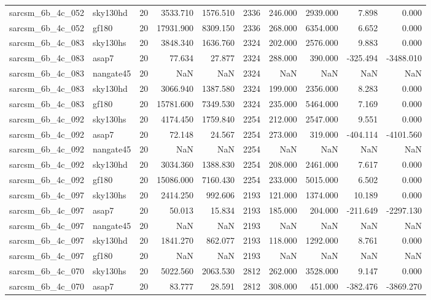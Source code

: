 \begin{longtable}{llrrrrrrrr}
sarcsm\_6b\_4c\_052 & sky130hd & 20 & 3533.710 & 1576.510 & 2336 & 246.000 & 2939.000 & 7.898 & 0.000 \\
sarcsm\_6b\_4c\_052 & gf180 & 20 & 17931.900 & 8309.150 & 2336 & 268.000 & 6354.000 & 6.652 & 0.000 \\
sarcsm\_6b\_4c\_083 & sky130hs & 20 & 3848.340 & 1636.760 & 2324 & 202.000 & 2576.000 & 9.883 & 0.000 \\
sarcsm\_6b\_4c\_083 & asap7 & 20 & 77.634 & 27.877 & 2324 & 288.000 & 390.000 & -325.494 & -3488.010 \\
sarcsm\_6b\_4c\_083 & nangate45 & 20 & NaN & NaN & 2324 & NaN & NaN & NaN & NaN \\
sarcsm\_6b\_4c\_083 & sky130hd & 20 & 3066.940 & 1387.580 & 2324 & 199.000 & 2356.000 & 8.283 & 0.000 \\
sarcsm\_6b\_4c\_083 & gf180 & 20 & 15781.600 & 7349.530 & 2324 & 235.000 & 5464.000 & 7.169 & 0.000 \\
sarcsm\_6b\_4c\_092 & sky130hs & 20 & 4174.450 & 1759.840 & 2254 & 212.000 & 2547.000 & 9.551 & 0.000 \\
sarcsm\_6b\_4c\_092 & asap7 & 20 & 72.148 & 24.567 & 2254 & 273.000 & 319.000 & -404.114 & -4101.560 \\
sarcsm\_6b\_4c\_092 & nangate45 & 20 & NaN & NaN & 2254 & NaN & NaN & NaN & NaN \\
sarcsm\_6b\_4c\_092 & sky130hd & 20 & 3034.360 & 1388.830 & 2254 & 208.000 & 2461.000 & 7.617 & 0.000 \\
sarcsm\_6b\_4c\_092 & gf180 & 20 & 15086.000 & 7160.430 & 2254 & 233.000 & 5015.000 & 6.502 & 0.000 \\
sarcsm\_6b\_4c\_097 & sky130hs & 20 & 2414.250 & 992.606 & 2193 & 121.000 & 1374.000 & 10.189 & 0.000 \\
sarcsm\_6b\_4c\_097 & asap7 & 20 & 50.013 & 15.834 & 2193 & 185.000 & 204.000 & -211.649 & -2297.130 \\
sarcsm\_6b\_4c\_097 & nangate45 & 20 & NaN & NaN & 2193 & NaN & NaN & NaN & NaN \\
sarcsm\_6b\_4c\_097 & sky130hd & 20 & 1841.270 & 862.077 & 2193 & 118.000 & 1292.000 & 8.761 & 0.000 \\
sarcsm\_6b\_4c\_097 & gf180 & 20 & NaN & NaN & 2193 & NaN & NaN & NaN & NaN \\
sarcsm\_6b\_4c\_070 & sky130hs & 20 & 5022.560 & 2063.530 & 2812 & 262.000 & 3528.000 & 9.147 & 0.000 \\
sarcsm\_6b\_4c\_070 & asap7 & 20 & 83.777 & 28.591 & 2812 & 308.000 & 451.000 & -382.476 & -3869.270 \\

\end{longtable}
